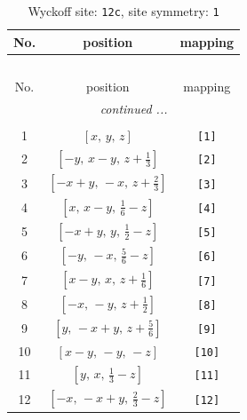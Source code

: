 \documentclass[fleqn,8pt]{jsarticle}
\begin{document}
\begin{longtable}{ccc}
\caption{Wyckoff site: {\tt 12c}, site symmetry: {\tt 1}}
 \\
 \hline \hline
No. & position & mapping \\ \hline \endfirsthead

\multicolumn{2}{l}{\tablename\ \thetable{}} \\
 \hline \hline
No. & position & mapping \\ \hline \endhead

 \hline \hline
\multicolumn{2}{r}{\footnotesize\it continued ...} \\ \endfoot

 \hline \hline
\multicolumn{2}{r}{} \\ \endlastfoot

1 & $\left[ x,\, y,\, z \right]$ & {\tt [1]} \\ \hline
2 & $\left[ - y,\, x - y,\, z + \frac{1}{3} \right]$ & {\tt [2]} \\ \hline
3 & $\left[ - x + y,\, - x,\, z + \frac{2}{3} \right]$ & {\tt [3]} \\ \hline
4 & $\left[ x,\, x - y,\, \frac{1}{6} - z \right]$ & {\tt [4]} \\ \hline
5 & $\left[ - x + y,\, y,\, \frac{1}{2} - z \right]$ & {\tt [5]} \\ \hline
6 & $\left[ - y,\, - x,\, \frac{5}{6} - z \right]$ & {\tt [6]} \\ \hline
7 & $\left[ x - y,\, x,\, z + \frac{1}{6} \right]$ & {\tt [7]} \\ \hline
8 & $\left[ - x,\, - y,\, z + \frac{1}{2} \right]$ & {\tt [8]} \\ \hline
9 & $\left[ y,\, - x + y,\, z + \frac{5}{6} \right]$ & {\tt [9]} \\ \hline
10 & $\left[ x - y,\, - y,\, - z \right]$ & {\tt [10]} \\ \hline
11 & $\left[ y,\, x,\, \frac{1}{3} - z \right]$ & {\tt [11]} \\ \hline
12 & $\left[ - x,\, - x + y,\, \frac{2}{3} - z \right]$ & {\tt [12]} \\
\end{longtable}
\end{document}
